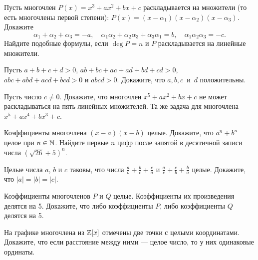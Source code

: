 \documentclass[a4paper,12pt]{article}
\begin{document}






 Пусть многочлен $P(x)=x^3+ax^2+bx+c$
раскладывается на  множители (то есть многочлены
первой степени):
$P(x)=(x-\alpha_1)(x-\alpha_2)(x-\alpha_3)$.
Докажите 
$$\alpha_1+\alpha_2+\alpha_3=-a, \quad
\alpha_1\alpha_2+\alpha_2\alpha_3+\alpha_3\alpha_1=b,\quad
\alpha_1\alpha_2\alpha_3=-c.$$
 Найдите подобные формулы, если $\deg P=n$ и
$P$ раскладывается на линейные множители.


Пусть $a+b+c+d>0$, $ab+bc+ac+ad+bd+cd>0$, $abc+abd+acd+bcd>0$ и $abcd>0.$
Докажите, что $a,b,c$~и~$d$ положительны.

 Пусть число $c \ne 0.$  Докажите, что  многочлен $x^5+ax^2+bx+c$
не может раскладываться на пять линейных множителей.
 Та же задача для многочлена $x^5+ax^4+bx^3+c$.

 Коэффициенты многочлена $(x-a)(x-b)$ целые.
Докажите, что $a^n+b^n$ целое при $n\in\mathbb{N}$.
 Найдите первые $n$ цифр после запятой в десятичной записи
числа $(\sqrt{26}+5)^n$.


Целые числа $a$, $b$ и $c$ таковы, что числа $\frac ab+\frac bc+ \frac ca$ и $\frac ac+ \frac cb+ \frac ba$ целые. Докажите, что $|a|=|b|=|c|$.



Коэффициенты многочленов $P$ и $Q$ целые. Коэффициенты
их произведения делятся на 5. Докажите, что либо коэффициенты $P$,
либо коэффициенты $Q$ делятся на 5.


На графике многочлена из $\mathbb{Z}[x]$ отмечены две точки с целыми координатами. Докажите, что если
расстояние между ними --- целое число, то у них одинаковые ординаты. %
\end{document}
